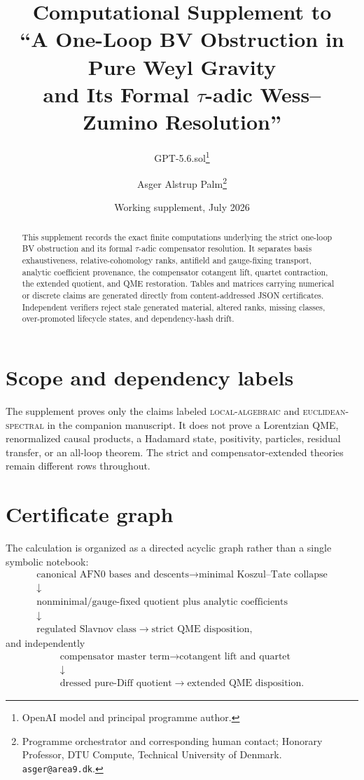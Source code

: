 \documentclass[11pt]{article}
\title{Computational Supplement to\\
``A One-Loop BV Obstruction in Pure Weyl Gravity\\
and Its Formal \texorpdfstring{$\tau$}{tau}-adic Wess--Zumino Resolution''}
\author{GPT-5.6.sol\thanks{OpenAI model and principal programme author.}
\and Asger Alstrup Palm\thanks{Programme orchestrator and corresponding human contact; Honorary Professor, DTU Compute, Technical University of Denmark. \texttt{asger@area9.dk}.}}
\date{Working supplement, July 2026}
\theoremstyle{definition}
\theoremstyle{remark}
\begin{document}
\maketitle

\begin{abstract}
This supplement records the exact finite computations underlying the strict
one-loop BV obstruction and its formal $\tau$-adic compensator resolution.  It
separates basis exhaustiveness, relative-cohomology ranks, antifield and
gauge-fixing transport, analytic coefficient provenance, the compensator
cotangent lift, quartet contraction, the extended quotient, and QME
restoration.  Tables and matrices carrying numerical or discrete claims are
generated directly from content-addressed JSON certificates.  Independent
verifiers reject stale generated material, altered ranks, missing classes,
over-promoted lifecycle states, and dependency-hash drift.
\end{abstract}

\section*{Scope and dependency labels}

The supplement proves only the claims labeled \textsc{local-algebraic} and
\textsc{euclidean-spectral} in the companion manuscript.  It does not prove
a Lorentzian QME, renormalized causal products, a Hadamard state, positivity,
particles, residual transfer, or an all-loop theorem.  The strict and
compensator-extended theories remain different rows throughout.

\tableofcontents

\section{Certificate graph}

The calculation is organized as a directed acyclic graph rather than a single
symbolic notebook:
\[
\begin{gathered}
\text{canonical AFN0 bases and descents}
\longrightarrow \text{minimal Koszul--Tate collapse}
\\[1mm]
\downarrow\\[-1mm]
\text{nonminimal/gauge-fixed quotient plus analytic coefficients}
\\[1mm]
\downarrow\\[-1mm]
\text{regulated Slavnov class}
\longrightarrow \text{strict QME disposition},
\end{gathered}
\]
and independently
\[
\begin{gathered}
\text{compensator master term}
\longrightarrow \text{cotangent lift and quartet}
\\[1mm]
\downarrow\\[-1mm]
\text{dressed pure-Diff quotient}
\longrightarrow \text{extended QME disposition}.
\end{gathered}
\]
\end{document}
